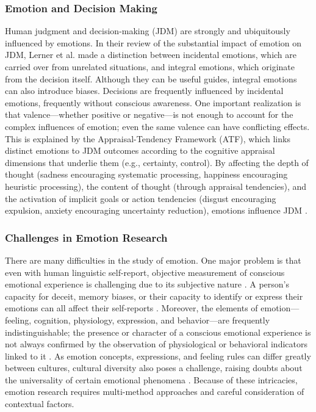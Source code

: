 \documentclass{DESSThesis}
\begin{document}
\subsubsection{Emotion and Decision Making}
Human judgment and decision-making (JDM) are strongly and ubiquitously influenced by emotions. In their review of the substantial impact of emotion on JDM, Lerner et al. made a distinction between incidental emotions, which are carried over from unrelated situations, and integral emotions, which originate from the decision itself. Although they can be useful guides, integral emotions can also introduce biases. Decisions are frequently influenced by incidental emotions, frequently without conscious awareness. One important realization is that valence—whether positive or negative—is not enough to account for the complex influences of emotion; even the same valence can have conflicting effects. This is explained by the Appraisal-Tendency Framework (ATF), which links distinct emotions to JDM outcomes according to the cognitive appraisal dimensions that underlie them (e.g., certainty, control). By affecting the depth of thought (sadness encouraging systematic processing, happiness encouraging heuristic processing), the content of thought (through appraisal tendencies), and the activation of implicit goals or action tendencies (disgust encouraging expulsion, anxiety encouraging uncertainty reduction), emotions influence JDM \cite{lerner_emotion_2015}.

\subsubsection{Challenges in Emotion Research}
There are many difficulties in the study of emotion. One major problem is that even with human linguistic self-report, objective measurement of conscious emotional experience is challenging due to its subjective nature \cite{paul_towards_2020}. A person's capacity for deceit, memory biases, or their capacity to identify or express their emotions can all affect their self-reports \cite{paul_towards_2020}. Moreover, the elements of emotion—feeling, cognition, physiology, expression, and behavior—are frequently indistinguishable; the presence or character of a conscious emotional experience is not always confirmed by the observation of physiological or behavioral indicators linked to it \cite{paul_towards_2020}. As emotion concepts, expressions, and feeling rules can differ greatly between cultures, cultural diversity also poses a challenge, raising doubts about the universality of certain emotional phenomena \cite{mun_science_2022,nummenmaa_bodily_2014,hochschild_emotion_1979}. Because of these intricacies, emotion research requires multi-method approaches and careful consideration of contextual factors.
\end{document}
